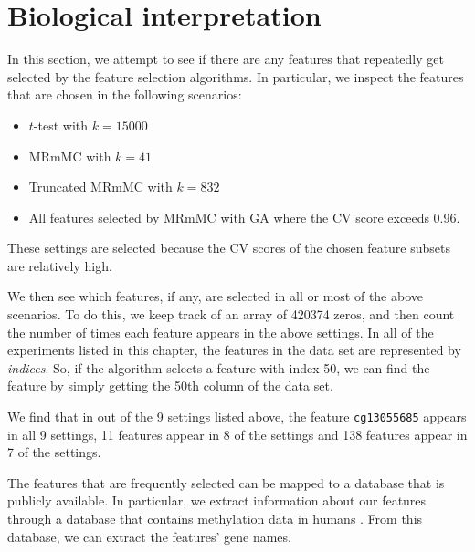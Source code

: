 \documentclass[12pt, twoside, a4paper]{report}
\begin{document}

\section{Biological interpretation} \label{bio:conclusion}

In this section, we attempt to see if there are any features that repeatedly get selected by the feature selection algorithms. In particular, we inspect the features that are chosen in the following scenarios:
\begin{itemize}
  \item $t$-test with $k=15000$
  \item MRmMC with $k=41$
  \item Truncated MRmMC with $k=832$
  \item All features selected by MRmMC with GA where the CV score exceeds 0.96. 
\end{itemize}

These settings are selected because the CV scores of the chosen feature subsets are relatively high.

We then see which features, if any, are selected in all or most of the above scenarios. To do this, we  keep track of an array of 420374 zeros, and then count the number of times each feature appears in the above settings. In all of the experiments listed in this chapter, the features in the data set are represented by \textit{indices}. So, if the algorithm selects a feature with index 50, we can find the feature by simply getting the 50th column of the data set.

We find that in out of the 9 settings listed above, the feature \texttt{cg13055685} appears in all 9 settings, 11 features appear in 8 of the settings and 138 features appear in 7 of the settings.

The features that are frequently selected can be mapped to a database that is publicly available. In particular, we extract information about our features through a database that contains methylation data in humans \cite{bio_conclusion}. From this database, we can extract the features' gene names.
\end{document}
